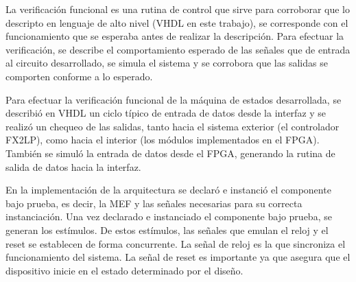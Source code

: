 La verificación funcional es una rutina de control que sirve para corroborar que lo descripto en lenguaje de alto nivel (VHDL en este trabajo), se corresponde con el funcionamiento que se esperaba antes de realizar la descripción. Para efectuar la verificación, se describe el comportamiento esperado de las señales que de entrada al circuito desarrollado, se simula el sistema y se corrobora que las salidas se comporten conforme a lo esperado.

Para efectuar la verificación funcional de la máquina de estados desarrollada, se describió en VHDL un ciclo típico de entrada de datos desde la interfaz y se realizó un chequeo de las salidas, tanto hacia el sistema exterior (el controlador FX2LP), como hacia el interior (los módulos implementados en el FPGA). También se simuló la entrada de datos desde el FPGA, generando la rutina de salida de datos hacia la interfaz.

%

En la implementación de la arquitectura se declaró e instanció el componente bajo prueba, es decir, la MEF y las señales necesarias para su correcta instanciación.
Una vez declarado e instanciado el componente bajo prueba, se generan los estímulos. De estos estímulos, las señales que emulan el reloj y el reset se establecen de forma concurrente. La señal de reloj es la que sincroniza el funcionamiento del sistema. La señal de reset es importante ya que asegura que el dispositivo inicie en el estado determinado por el diseño. 

